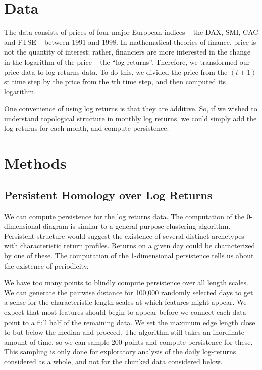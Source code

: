 \documentclass{article}
\begin{document}
\section{Data}
The data consists of prices of four major European indices – the DAX, SMI, CAC and FTSE – between 1991 and 1998. In mathematical theories of finance, price is not the quantity of interest; rather, financiers are more interested in the change in the logarithm of the price – the “log returns”. Therefore, we transformed our price data to log returns data. To do this, we divided the price from the $(t+1)$st time step by the price from the $t$th time step, and then computed its logarithm.

One convenience of using log returns is that they are additive. So, if we wished to understand topological structure in monthly log returns, we could simply add the log returns for each month, and compute persistence. 

\section{Methods}

\subsection{Persistent Homology over Log Returns}
We can compute persistence for the log returns data. The computation of the  0-dimensional diagram is similar to a general-purpose clustering algorithm. Persistent structure would suggest the existence of several distinct archetypes with characteristic return profiles. Returns on a given day could be characterized by one of these. The computation of the 1-dimensional persistence tells us about the existence of periodicity. 

We have too many points to blindly compute persistence over all length scales. We can generate the pairwise distance for 100,000 randomly selected days to get a sense for the characteristic length scales at which features might appear. We expect that most features should begin to appear before we connect each data point to a full half of the remaining data. We set the maximum edge length close to but below the median and proceed. The algorithm still takes an inordinate amount of time, so we can sample 200 points and compute persistence for these. This sampling is only done for exploratory analysis of the daily log-returns considered as a whole, and not for the chunked data considered below.
\end{document}
